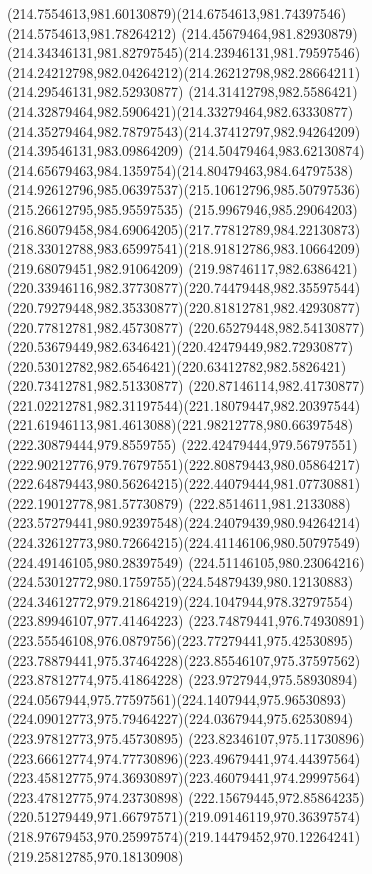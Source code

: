 {{		\curveto(214.7554613,981.60130879)(214.6754613,981.74397546)(214.5754613,981.78264212)
		\curveto(214.45679464,981.82930879)(214.34346131,981.82797545)(214.23946131,981.79597546)
		\curveto(214.24212798,982.04264212)(214.26212798,982.28664211)(214.29546131,982.52930877)
		\curveto(214.31412798,982.5586421)(214.32879464,982.5906421)(214.33279464,982.63330877)
		\curveto(214.35279464,982.78797543)(214.37412797,982.94264209)(214.39546131,983.09864209)
		\curveto(214.50479464,983.62130874)(214.65679463,984.1359754)(214.80479463,984.64797538)
		\curveto(214.92612796,985.06397537)(215.10612796,985.50797536)(215.26612795,985.95597535)
		\curveto(215.9967946,985.29064203)(216.86079458,984.69064205)(217.77812789,984.22130873)
		\curveto(218.33012788,983.65997541)(218.91812786,983.10664209)(219.68079451,982.91064209)
		\curveto(219.98746117,982.6386421)(220.33946116,982.37730877)(220.74479448,982.35597544)
		\curveto(220.79279448,982.35330877)(220.81812781,982.42930877)(220.77812781,982.45730877)
		\curveto(220.65279448,982.54130877)(220.53679449,982.6346421)(220.42479449,982.72930877)
		\curveto(220.53012782,982.6546421)(220.63412782,982.5826421)(220.73412781,982.51330877)
		\curveto(220.87146114,982.41730877)(221.02212781,982.31197544)(221.18079447,982.20397544)
		\curveto(221.61946113,981.4613088)(221.98212778,980.66397548)(222.30879444,979.8559755)
		\curveto(222.42479444,979.56797551)(222.90212776,979.76797551)(222.80879443,980.05864217)
		\curveto(222.64879443,980.56264215)(222.44079444,981.07730881)(222.19012778,981.57730879)
		\curveto(222.8514611,981.2133088)(223.57279441,980.92397548)(224.24079439,980.94264214)
		\curveto(224.32612773,980.72664215)(224.41146106,980.50797549)(224.49146105,980.28397549)
		\curveto(224.51146105,980.23064216)(224.53012772,980.1759755)(224.54879439,980.12130883)
		\curveto(224.34612772,979.21864219)(224.1047944,978.32797554)(223.89946107,977.41464223)
		\curveto(223.74879441,976.74930891)(223.55546108,976.0879756)(223.77279441,975.42530895)
		\curveto(223.78879441,975.37464228)(223.85546107,975.37597562)(223.87812774,975.41864228)
		\curveto(223.9727944,975.58930894)(224.0567944,975.77597561)(224.1407944,975.96530893)
		\curveto(224.09012773,975.79464227)(224.0367944,975.62530894)(223.97812773,975.45730895)
		\curveto(223.82346107,975.11730896)(223.66612774,974.77730896)(223.49679441,974.44397564)
		\curveto(223.45812775,974.36930897)(223.46079441,974.29997564)(223.47812775,974.23730898)
		\curveto(222.15679445,972.85864235)(220.51279449,971.66797571)(219.09146119,970.36397574)
		\curveto(218.97679453,970.25997574)(219.14479452,970.12264241)(219.25812785,970.18130908)
}}
